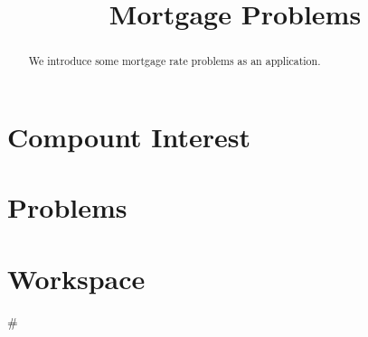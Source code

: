 \documentclass{ximera}
\title{Mortgage Problems}
\begin{document}
\begin{abstract}  
We introduce some mortgage rate problems as an application.
\end{abstract}  
\maketitle

\section{Compount Interest}

\section{Problems}

\begin{question}
\end{question}

\begin{question}
\end{question}

\section{Workspace}

\begin{sageCell}
#
\end{sageCell}
\end{document}
